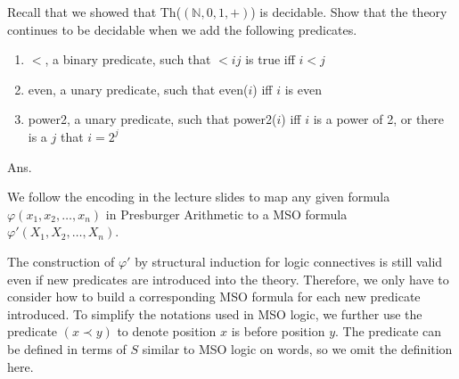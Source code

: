 \documentclass[11pt]{homework}
\begin{document}
\maketitle


\question
 Recall that we showed that Th(\((\mathbb{N},0,1,+)\)) is decidable. 
 Show that the theory continues to be decidable when we add the following predicates.

\begin{enumerate}
  \item \(<\), a binary predicate, such that \(< ij\) is true iff \(i < j\)
  \item even, a unary predicate, such that even(\(i\)) iff \(i\) is even
  \item power2, a unary predicate,
        such that power2(\(i\)) iff \(i\) is a power of 2,
        or there is a \(j\) that \(i = 2^j\)
\end{enumerate}

Ans.

We follow the encoding in the lecture slides to map any given formula 
\(\varphi (x_1, x_2,\dotsc,x_n)\) in Presburger Arithmetic to a MSO formula
\(\varphi'(X_1, X_2,\dotsc,X_n)\).

The construction of \(\varphi'\) by structural induction for logic connectives
is still valid even if new predicates are introduced into the theory.
Therefore, we only have to consider how to build a corresponding MSO formula for
each new predicate introduced.
To simplify the notations used in MSO logic,
we further use the predicate \((x \prec y)\) to denote position \(x\) is
before position \(y\).
The predicate can be defined in terms of \(S\) similar to MSO logic on words,
so we omit the definition here.
\end{document}
